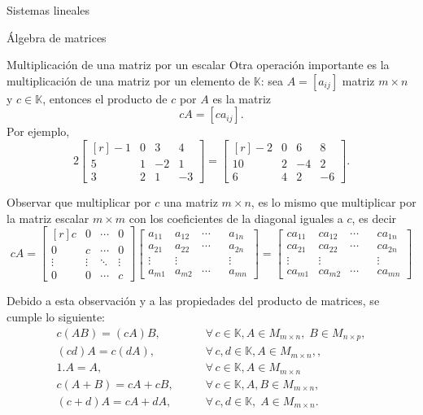 \documentclass[a4paper,12pt,twoside,spanish,reqno]{amsbook}
\theoremstyle{definition}
\theoremstyle{remark}
\newcommand{\K}{\mathbb K}
\begin{document}
\begin{chapter}{Sistemas lineales}
\begin{section}{Álgebra de matrices}
		
		\begin{subsection}{Multiplicación de una matriz por un escalar} Otra operación importante es la multiplicación de una matriz por un elemento de $\K$: sea $A=[a_{ij}]$ matriz $m \times n$ y $c \in \K$,  entonces el producto de $c$ por $A$ es la matriz
			$$
			cA=[ca_{ij}].
			$$ 
		Por ejemplo, 
		$$
		2\begin{bmatrix*}[r]
		-1& 0& 3 & 4\\
		5& 1& -2 & 1\\
		3& 2& 1 & -3
		\end{bmatrix*} =
		\begin{bmatrix*}[r]
		-2& 0& 6& 8\\
		10& 2& -4 & 2\\
		6& 4& 2 & -6
		\end{bmatrix*}.
		$$
		
		Observar que multiplicar por $c$ una matriz $m \times n$,  es lo mismo que multiplicar por la matriz escalar $m \times m$ con los coeficientes de la diagonal iguales a $c$,  es decir
		\begin{equation}
			cA = \begin{bmatrix*}[r]
			c     &     0& \cdots & 0\\
			0     &     c& \cdots & 0\\
			\vdots&\vdots&  \ddots      &\vdots\\
			0     &    0  & \cdots & c
			\end{bmatrix*}
			 \begin{bmatrix}
			a_{11}&a_{12}& \cdots & & a_{1n}\\
			a_{21}&a_{22}& \cdots & &a_{2n}\\
			\vdots&\vdots&  & &\vdots\\
			a_{m1}&a_{m2}& \cdots & & a_{mn}
			\end{bmatrix} =
			 \begin{bmatrix}
			ca_{11}&ca_{12}& \cdots & & ca_{1n}\\
			ca_{21}&ca_{22}& \cdots & &ca_{2n}\\
			\vdots&\vdots&  & &\vdots\\
			ca_{m1}&ca_{m2}& \cdots & & ca_{mn}
			\end{bmatrix}
		\end{equation}
		
		Debido a esta observación y a las propiedades del producto de matrices, se cumple lo siguiente:
			\begin{align*}
			 c(A B) = (cA) B,\qquad &\forall\, c \in \K,  A \in M_{m \times n}, \;B \in M_{n \times p}, \\
			 (cd)A = c(dA),  \qquad &\forall\, c,d \in \K,  A \in M_{m \times n},, \\
			1.A = A ,\qquad&\forall\, c \in \K, A \in M_{m \times n}\\
			c(A + B) = cA + cB,\qquad& \forall\, c \in \K, A,B \in M_{m \times n}, \\
			(c+ d)A = cA + dA,\qquad& \forall\, c,d \in \K, \; A \in M_{m \times n}.
			\end{align*}
			

\end{subsection}
\end{section}
\end{chapter}
\end{document}

